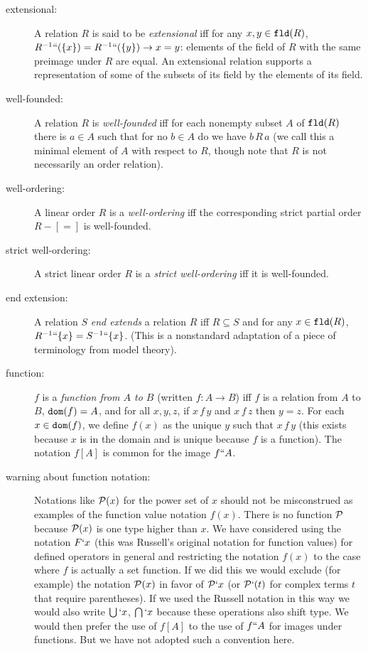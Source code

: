 \documentclass[12pt]{book}
\begin{document}
\begin{description}
\item[extensional:] A relation $R$ is said to be {\em extensional\/}
iff for any $x,y \in {\tt fld}(R)$,
$R^{-1}``(\{x\})=R^{-1}``(\{y\})\rightarrow x=y$: elements of the
field of $R$ with the same preimage under $R$ are equal.  An
extensional relation supports a representation of some of the subsets
of its field by the elements of its field.

\item[well-founded:] A relation $R$ is {\em well-founded\/} iff for each
nonempty subset $A$ of ${\tt fld}(R)$ there is $a\in A$ such that for
no $b\in A$ do we have $b \,R\,a$ (we call this a minimal element of
$A$ with respect to $R$, though note that $R$ is not necessarily an
order relation).

\item[well-ordering:] A linear order $R$ is a {\em well-ordering\/} iff the
corresponding strict partial order $R-[=]$ is well-founded.

\item[strict well-ordering:] A strict linear order $R$ is a {\em strict
well-ordering\/} iff it is well-founded.

\item[end extension:] A relation $S$ {\em end extends\/} a relation $R$
iff $R \subseteq S$ and for any $x \in {\tt fld}(R)$, $R^{-1}``\{x\} =
S^{-1}``\{x\}$.  (This is a nonstandard adaptation of a piece of
terminology from model theory).

\item[function:] $f$ is a {\em function from $A$ to $B$\/} (written
$f:A\rightarrow B$) iff $f$ is a relation from $A$ to $B$, ${\tt dom}(f)=A$,  and for all
$x,y,z$, if $x\,f\,y$ and $x\,f\,z$ then $y=z$.  For each $x\in {\tt
dom}(f)$, we define $f(x)$ as the unique $y$ such that $x\,f\,y$ (this
exists because $x$ is in the domain and is unique because $f$ is a
function).  The notation $f[A]$ is common for the image $f``A$.

\item[warning about function notation:] Notations like ${\cal P}(x)$
for the power set of $x$ should not be misconstrued as examples of the
function value notation $f(x)$.  There is no function $\cal P$ because
${\cal P}(x)$ is one type higher than $x$.  We have considered using
the notation $F`x$ (this was Russell's original notation for function
values) for defined operators in general and restricting the notation
$f(x)$ to the case where $f$ is actually a set function.  If we did
this we would exclude (for example) the notation ${\cal P}(x)$ in
favor of ${\cal P}`x$ (or ${\cal P}`(t)$ for complex terms $t$ that
require parentheses).  If we used the Russell notation in this way we
would also write $\bigcup`x$, $\bigcap`x$ because these operations
also shift type.  We would then prefer the use of $f[A]$ to the use of
$f``A$ for images under functions.  But we have not adopted such a
convention here.


\end{description}
\end{document}
